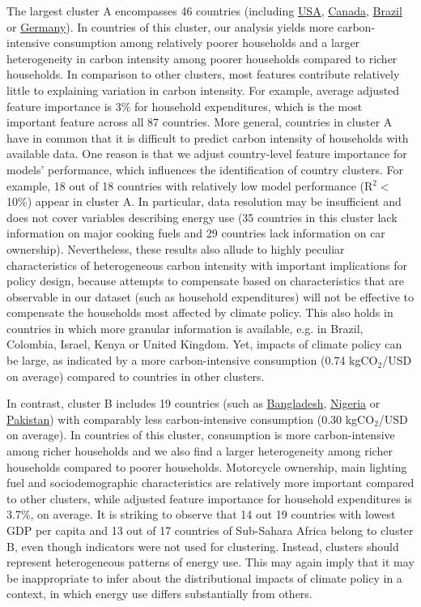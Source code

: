 \documentclass[12pt, a4paper]{article}
\begin{document}
The largest cluster A encompasses 46 countries (including \hyperref[fig:5b_USA]{USA}, \hyperref[fig:5b_CAN]{Canada}, \hyperref[fig:5b_BRA]{Brazil} or \hyperref[fig:5b_DEU]{Germany}). In countries of this cluster, our analysis yields more carbon-intensive consumption among relatively poorer households and a larger heterogeneity in carbon intensity among poorer households compared to richer households. In comparison to other clusters, most features contribute relatively little to explaining variation in carbon intensity. For example, average adjusted feature importance is 3\% for household expenditures, which is the most important feature across all 87 countries. More general, countries in cluster A have in common that it is difficult to predict carbon intensity of households with available data. One reason is that we adjust country-level feature importance for models' performance, which influences the identification of country clusters. For example, 18 out of 18 countries with relatively low model performance (R$^{2}<$10\%) appear in cluster A. In particular, data resolution may be insufficient and does not cover variables describing energy use (35 countries in this cluster lack information on major cooking fuels and 29 countries lack information on car ownership). Nevertheless, these results also allude to highly peculiar characteristics of heterogeneous carbon intensity with important implications for policy design, because attempts to compensate based on characteristics that are observable in our dataset (such as household expenditures) will not be effective to compensate the households most affected by climate policy. This also holds in countries in which more granular information is available, e.g. in Brazil, Colombia, Israel, Kenya or United Kingdom. Yet, impacts of climate policy can be large, as indicated by a more carbon-intensive consumption (0.74 kgCO$_{2}$/USD on average) compared to countries in other clusters. 

In contrast, cluster B includes 19 countries (such as \hyperref[fig:5b_BGD]{Bangladesh}, \hyperref[fig:5b_NGA]{Nigeria} or \hyperref[fig:5b_PAK]{Pakistan}) with comparably less carbon-intensive consumption (0.30 kgCO$_{2}$/USD on average). In countries of this cluster, consumption is more carbon-intensive among richer households and we also find a larger heterogeneity among richer households compared to poorer households. Motorcycle ownership, main lighting fuel and sociodemographic characteristics are relatively more important compared to other clusters, while adjusted feature importance for household expenditures is 3.7\%, on average. It is striking to observe that 14 out 19 countries with lowest GDP per capita and 13 out of 17 countries of Sub-Sahara Africa belong to cluster B, even though indicators were not used for clustering. Instead, clusters should represent heterogeneous patterns of energy use. This may again imply that it may be inappropriate to infer about the distributional impacts of climate policy in a context, in which energy use differs substantially from others. 
\end{document}
